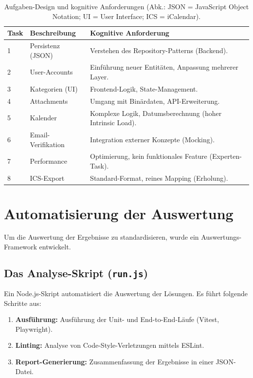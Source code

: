 \begin{table}[ht]
    \centering
    \begingroup\sloppy
    \small
    \setlength{\tabcolsep}{3pt}
    \begin{tabular}{|p{}|>{\raggedright\arraybackslash}p{}|>{\raggedright\arraybackslash}p{}|}
    \hline
     \textbf{Task} &  \textbf{Beschreibung} &  \textbf{Kognitive Anforderung} \\ \hline
    1 & Persistenz (JSON) & Verstehen des Repository-Patterns (Backend). \\ \hline
    2 & User-Accounts & Einführung neuer Entitäten, Anpassung mehrerer Layer. \\ \hline
    3 & Kategorien (UI) & Frontend-Logik, State-Management. \\ \hline
    4 & Attachments & Umgang mit Binärdaten, API-Erweiterung. \\ \hline
    5 & Kalender & Komplexe Logik, Datumsberechnung (hoher Intrinsic Load). \\ \hline
    6 & Email-Verifikation & Integration externer Konzepte (Mocking). \\ \hline
    7 & Performance & Optimierung, kein funktionales Feature (Experten-Task). \\ \hline
    8 & ICS-Export & Standard-Format, reines Mapping (Erholung). \\ \hline
    \end{tabular}
    \endgroup
    \caption{Aufgaben-Design und kognitive Anforderungen (Abk.: JSON = JavaScript Object Notation; UI = User Interface; ICS = iCalendar).}
    \label{tab:task-design}
\end{table}

\section{Automatisierung der Auswertung}

Um die Auswertung der Ergebnisse zu standardisieren, wurde ein Auswertungs-Framework entwickelt.

\subsection{Das Analyse-Skript (\texttt{run.js})}
Ein Node.js-Skript automatisiert die Auswertung der Lösungen. Es führt folgende Schritte aus:
\begin{enumerate}
    \item  \textbf{Ausführung:} Ausführung der Unit- und End-to-End-Läufe (Vitest, Playwright).
    \item  \textbf{Linting:} Analyse von Code-Style-Verletzungen mittels ESLint.
    \item  \textbf{Report-Generierung:} Zusammenfassung der Ergebnisse in einer JSON-Datei.
\end{enumerate}


